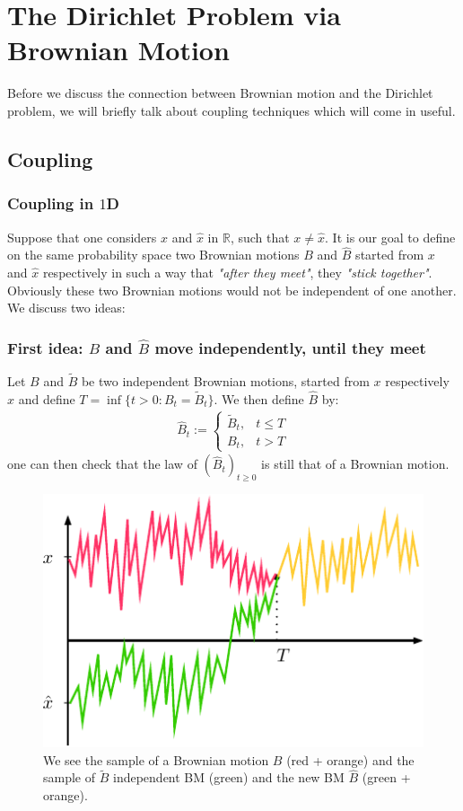 \documentclass[../mainfile.tex]{subfiles}
\begin{document}
\section{The Dirichlet Problem via Brownian Motion}
Before we discuss the connection between Brownian motion and the Dirichlet problem, we will briefly talk about coupling techniques which will come in useful. 
\subsection{Coupling}
\subsubsection{Coupling in $1$D}
Suppose that one considers $x$ and $\hat{x}$ in $\mathbb{R}$, such that $x \neq \hat{x}$. It is our goal to define on the same probability space two Brownian motions $B$ and $\hat{B}$ started from $x$ and $\hat{x}$ respectively in such a way that \textit{"after they meet"}, they \textit{"stick together"}. Obviously these two Brownian motions would not be independent of one another. We discuss two ideas:
\subsubsection{First idea: $B$ and $\hat{B}$ move independently, until they meet}
Let $B$ and $\tilde{B}$ be two independent Brownian motions, started from $x$ respectively $\hat{x}$ and define $T= \inf \{ t >0 : B_t = \tilde{B}_t \}$. We then define $\hat{B}$ by:
\begin{align*}
\hat{B}_t := \begin{cases} \tilde{B}_t, & t \leq T \\
B_t, & t >T \end{cases}
\end{align*}
one can then check that the law of $(\hat{B}_t)_{t \geq 0}$ is still that of a Brownian motion. 
\begin{figure}[hbtp]
\centering
\includegraphics[scale=.8]{coupling1.pdf}
\caption{We see the sample of a Brownian motion $B$ (red + orange) and the sample of $\tilde{B}$ independent BM (green) and the new BM $\hat{B}$ (green + orange).}
\end{figure}
\newpage
\end{document}
